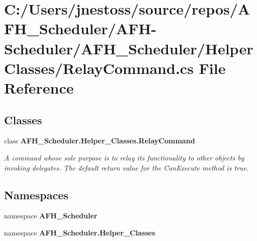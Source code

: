 \section{C\+:/\+Users/jnestoss/source/repos/\+A\+F\+H\+\_\+\+Scheduler/\+A\+F\+H-\/\+Scheduler/\+A\+F\+H\+\_\+\+Scheduler/\+Helper\+Classes/\+Relay\+Command.cs File Reference}
\label{_relay_command_8cs}
\subsection*{Classes}
\begin{DoxyCompactItemize}
\item 
class \textbf{ A\+F\+H\+\_\+\+Scheduler.\+Helper\+\_\+\+Classes.\+Relay\+Command}
\begin{DoxyCompactList}\small\item\em A command whose sole purpose is to relay its functionality to other objects by invoking delegates. The default return value for the Can\+Execute method is \textquotesingle{}true\textquotesingle{}. \end{DoxyCompactList}\end{DoxyCompactItemize}
\subsection*{Namespaces}
\begin{DoxyCompactItemize}
\item 
namespace \textbf{ A\+F\+H\+\_\+\+Scheduler}
\item 
namespace \textbf{ A\+F\+H\+\_\+\+Scheduler.\+Helper\+\_\+\+Classes}
\end{DoxyCompactItemize}
